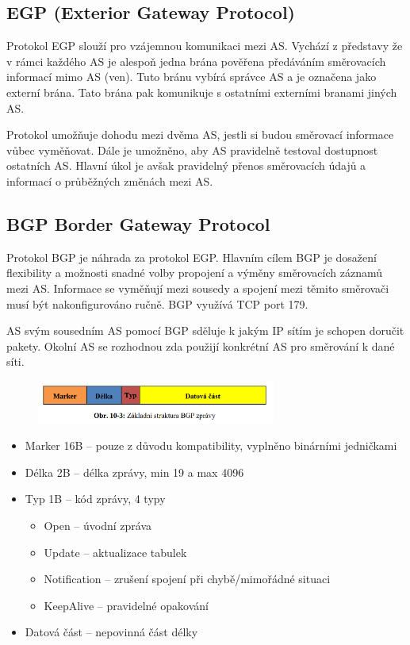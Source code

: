 \subsection{EGP (Exterior Gateway Protocol)}

Protokol EGP slouží pro vzájemnou komunikaci mezi AS.
Vychází z představy že v rámci každého AS je alespoň jedna brána pověřena předáváním směrovacích informací mimo AS (ven).
Tuto bránu vybírá správce AS a je označena jako externí brána.
Tato brána pak komunikuje s ostatními externími branami jiných AS.

Protokol umožňuje dohodu mezi dvěma AS, jestli si budou směrovací informace vůbec vyměňovat.
Dále je umožněno, aby AS pravidelně testoval dostupnost ostatních AS.
Hlavní úkol je avšak pravidelný přenos směrovacích údajů a informací o průběžných změnách mezi AS.

\subsection{BGP Border Gateway Protocol}

Protokol BGP je náhrada za protokol EGP.
Hlavním cílem BGP je dosažení flexibility a možnosti snadné volby propojení a výměny směrovacích záznamů mezi AS.
Informace se vyměňují mezi sousedy a spojení mezi těmito směrovači musí být nakonfigurováno ručně.
BGP využívá TCP port 179.

AS svým sousedním AS pomocí BGP sděluje k jakým IP sítím je schopen doručit pakety.
Okolní AS se rozhodnou zda použijí konkrétní AS pro směrování k dané síti.

\begin{figure}[!h]
    \centering
    \includegraphics[width=0.7\textwidth]{obrazky/091.png}
\end{figure}

\begin{itemize}[noitemsep]
    \item Marker 16B -- pouze z důvodu kompatibility, vyplněno binárními jedničkami
    \item Délka 2B -- délka zprávy, min 19 a max 4096
    \item Typ 1B -- kód zprávy, 4 typy
    \begin{itemize}[noitemsep]
        \item Open -- úvodní zpráva
        \item Update -- aktualizace tabulek
        \item Notification -- zrušení spojení při chybě/mimořádné situaci
        \item KeepAlive -- pravidelné opakování
    \end{itemize}
    \item Datová část -- nepovinná část délky
\end{itemize}




